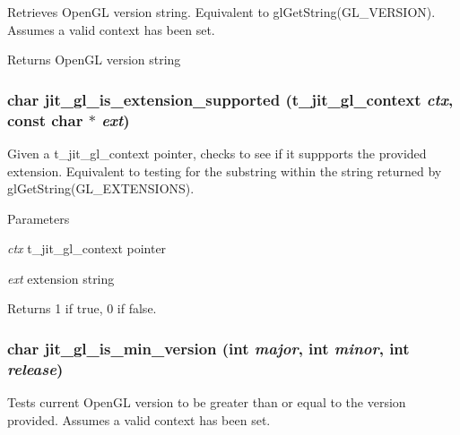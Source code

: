 Retrieves OpenGL version string. Equivalent to glGetString(GL\_\-VERSION). Assumes a valid context has been set.

\begin{DoxyReturn}{Returns}
OpenGL version string 
\end{DoxyReturn}
\hypertarget{group__ob3dmod_ga7fbf145730cc56b69fa200adfee552a1}{
\subsubsection[{jit\_\-gl\_\-is\_\-extension\_\-supported}]{\setlength{\rightskip}{0pt plus 5cm}char jit\_\-gl\_\-is\_\-extension\_\-supported (t\_\-jit\_\-gl\_\-context {\em ctx}, \/  const char $\ast$ {\em ext})}}
\label{group__ob3dmod_ga7fbf145730cc56b69fa200adfee552a1}


Given a t\_\-jit\_\-gl\_\-context pointer, checks to see if it suppports the provided extension. Equivalent to testing for the substring within the string returned by glGetString(GL\_\-EXTENSIONS).


\begin{DoxyParams}{Parameters}
\item[{\em ctx}]t\_\-jit\_\-gl\_\-context pointer \item[{\em ext}]extension string\end{DoxyParams}
\begin{DoxyReturn}{Returns}
1 if true, 0 if false. 
\end{DoxyReturn}
\hypertarget{group__ob3dmod_gad29a8caf0ac02591e97cb18176eac0e0}{
\subsubsection[{jit\_\-gl\_\-is\_\-min\_\-version}]{\setlength{\rightskip}{0pt plus 5cm}char jit\_\-gl\_\-is\_\-min\_\-version (int {\em major}, \/  int {\em minor}, \/  int {\em release})}}
\label{group__ob3dmod_gad29a8caf0ac02591e97cb18176eac0e0}


Tests current OpenGL version to be greater than or equal to the version provided. Assumes a valid context has been set.


